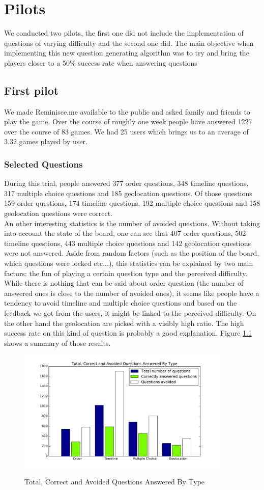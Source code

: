 \chapter{Pilots}
We conducted two pilots, the first one did not include the implementation of questions of varying difficulty and the second one did. The main objective when implementing this new question generating algorithm was to try and bring the players closer to a 50\% success rate when answering questions
\section{First pilot}
We made Reminisce.me available to the public and asked family and friends to play the game. Over the course of roughly one week people have answered 1227 over the course of 83 games. We had 25 users which brings us to an average of 3.32 games played by user.
\subsection{Selected Questions}
During this trial, people answered 377 order questions, 348 timeline questions, 317 multiple choice questions and 185 geolocation questions. Of those questions 159 order questions, 174 timeline questions, 192 multiple choice questions and 158 geolocation questions were correct.\\
An other interesting statistics is the number of avoided questions. Without taking into account the state of the board, one can see that 407 order questions, 502 timeline questions, 443 multiple choice questions and 142 geolocation questions were not answered. Aside from random factors (such as the position of the board, which questions were locked etc...), this statistics can be explained by two main factors: the fun of playing a certain question type and the perceived difficulty. While there is nothing that can be said about order question (the number of answered ones is close to the number of avoided ones), it seems like people have a tendency to avoid timeline and multiple choice questions and based on the feedback we got from the users, it might be linked to the perceived difficulty. On the other hand the geolocation are picked with a visibly high ratio. The high success rate on this kind of question is probably a good explanation. Figure \ref{fig:p1TotCorrectAvoid} shows a summary of those results.
\begin{figure}
\centering
{\includegraphics[width=4in]{images/pilot_1_selected_questions.pdf}}
\caption{Total, Correct and Avoided Questions Answered By Type}
\label{fig:p1TotCorrectAvoid}
\end{figure}
